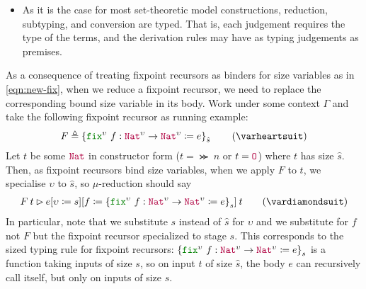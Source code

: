 \begin{itemize}
  \item As it is the case for most set-theoretic model constructions,
  reduction, subtyping, and conversion are typed.
  That is, each judgement requires the type of the terms,
  and the derivation rules may have as typing judgements as premises.
\end{itemize}

As a consequence of treating fixpoint recursors as binders for size
variables as in \eqref{eqn:new-fix}, when we reduce a fixpoint
recursor, we need to replace the corresponding bound size variable in
its body.
%
Work under some context $\Gamma$ and take the following fixpoint
recursor as running example:
%
\begin{align*}
  F \triangleq \left\{\kw{fix}^\upsilon ~ f : \Nat^\upsilon \to \Nat^\upsilon \coloneqq e\right\}_{\hat{s}}
  \label{eqn:fix-example}\tag{$\varheartsuit$}
\end{align*}
%
Let $t$ be some $\Nat$ in constructor form (\ie $t = \Succ ~ n$ or
$t = \Zero$) where $t$ has size $\hat{s}$.
%
Then, as fixpoint recursors bind size variables, when we apply $F$ to
$t$, we specialise $\upsilon$ to $\hat{s}$, so $\mu$-reduction should
say
%
\begin{align*}
  \app{F}{t} \rhd \app{\subst{\subst{e}{\upsilon}{s}}{f}{
  \left\{\kw{fix}^\upsilon ~ f : \Nat^\upsilon \to \Nat^\upsilon \coloneqq e\right\}_{s}
  }}{t}
  \label{eqn:mu-example}\tag{$\vardiamondsuit$}
\end{align*}
%
In particular, note that we substitute $s$ instead of $\hat{s}$ for
$\upsilon$ and we substitute for $f$ not $F$ but the fixpoint recursor
specialized to stage $s$.
%
This corresponds to the sized typing rule for fixpoint recursors:
$\left\{\kw{fix}^\upsilon ~ f : \Nat^\upsilon \to \Nat^\upsilon
  \coloneqq e\right\}_{s}$ is a function taking inputs of size $s$, so
on input $t$ of size $\hat{s}$, the body $e$ can recursively call
itself, but only on inputs of size $s$.

